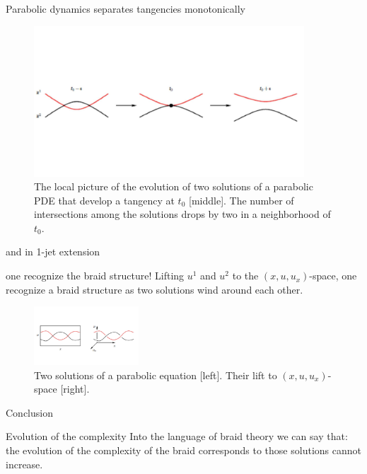 \documentclass[9pt, english]{beamer}
\theoremstyle{definition}
\begin{document}
\begin{frame}{Parabolic dynamics separates tangencies monotonically}
        \begin{figure}\label{fig:tangencies_separation}
        \includegraphics[width=0.9\textwidth]{images/Fig15Wojcik2.pdf}\caption{The local picture of the evolution of two solutions of
        a parabolic PDE that develop a tangency at $t_0$ [middle]. The number of intersections among the solutions
        drops by two in a neighborhood of $t_0$.}
        \end{figure}
\end{frame}
\begin{frame}{and in 1-jet extension}
    \begin{block}{one recognize the braid structure!}
        Lifting $u^1$ and $u^2$ to the $(x,u, u_x)$-space, one recognize
        a braid structure as two solutions wind around each other.
        \begin{figure}\label{fig:lift}
        \includegraphics[width=0.35\textwidth]{images/Fig16Wojcik21.pdf}\caption{Two solutions of a parabolic equation [left]. Their lift to
        $(x,u,u_x)$-space [right].}
        \end{figure}
    \end{block}
\end{frame}
\begin{frame}{Conclusion}
    \begin{block}{Evolution of the complexity} %
        Into the language of braid theory we can say that:\pause\\
        \alert{the evolution of the complexity of the braid corresponds to
        those solutions cannot increase.}
    \end{block}
\end{frame}
\end{document}
